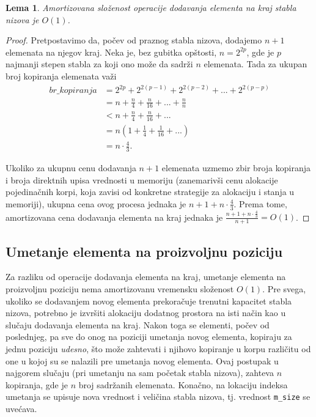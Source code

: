 \documentclass[a4paper]{article}
\newtheorem{lemma}[theorem]{Lema}
\begin{document}
\begin{lemma}
Amortizovana složenost operacije dodavanja elementa na kraj stabla nizova je $O(1)$.
\end{lemma}

\begin{proof}
Pretpostavimo da, počev od praznog stabla nizova, dodajemo $n + 1$ elemenata na njegov kraj. Neka je, bez gubitka opštosti, $n = 2^{2p}$, gde je $p$ najmanji stepen stabla za koji ono može da sadrži $n$ elemenata. Tada za ukupan broj kopiranja elemenata važi
\begin{equation}
\begin{split}
    br\_kopiranja &= 2^{2p} + 2^{2(p - 1)} + 2^{2(p - 2)} + ... + 2^{2(p - p)} \\
    &= n + \frac{n}{4} + \frac{n}{16} + ... + \frac{n}{n} \\
    &< n + \frac{n}{4} + \frac{n}{16} + ... \\
    &= n(1 + \frac{1}{4} + \frac{1}{16} + ...) \\
    &= n \cdot \frac{4}{3}.
\end{split}
\end{equation}

Ukoliko za ukupnu cenu dodavanja $n + 1$ elemenata uzmemo zbir broja kopiranja i broja direktnih upisa vrednosti u memoriju (zanemarivši cenu alokacije pojedinačnih korpi, koja zavisi od konkretne strategije za alokaciju i stanja u memoriji), ukupna cena ovog procesa jednaka je $n + 1 + n \cdot \frac{4}{3}$. Prema tome, amortizovana cena dodavanja elementa na kraj jednaka je $\frac{n + 1 + n \cdot \frac{4}{3}}{n + 1} = O(1)$.
\end{proof}

\subsection{Umetanje elementa na proizvoljnu poziciju}

Za razliku od operacije dodavanja elementa na kraj, umetanje elementa na proizvoljnu poziciju nema amortizovanu vremensku složenost $O(1)$. Pre svega, ukoliko se dodavanjem novog elementa prekoračuje trenutni kapacitet stabla nizova, potrebno je izvršiti alokaciju dodatnog prostora na isti način kao u slučaju dodavanja elementa na kraj. Nakon toga se elementi, počev od poslednjeg, pa sve do onog na poziciji umetanja novog elementa, kopiraju za jednu poziciju \textit{udesno}, što može zahtevati i njihovo kopiranje u korpu različitu od one u kojoj su se nalazili pre umetanja novog elementa. Ovaj postupak u najgorem slučaju (pri umetanju na sam početak stabla nizova), zahteva $n$ kopiranja, gde je $n$ broj sadržanih elemenata. Konačno, na lokaciju indeksa umetanja se upisuje nova vrednost i veličina stabla nizova, tj. vrednost \verb|m_size| se uvećava.
\end{document}
